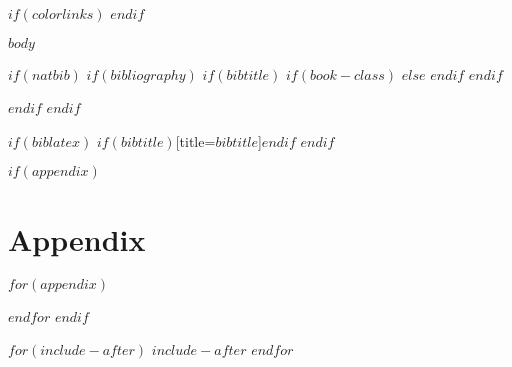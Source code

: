 \documentclass[a4paper, 12pt, twoside]{$thesis_class$}
\theoremstyle{plain}
\theoremstyle{definition}
\theoremstyle{remark}
\begin{document}
$if(colorlinks)$ \hypersetup{linkcolor=$if(linkcolor)$$linkcolor$$else$cyan$endif$} $endif$

$body$


$if(natbib)$
$if(bibliography)$
$if(bibtitle)$
$if(book-class)$
\renewcommand\bibname{$bibtitle$}
$else$
\renewcommand\refname{$bibtitle$}
$endif$
$endif$

$endif$
$endif$

$if(biblatex)$
\printbibliography$if(bibtitle)$[title=$bibtitle$]$endif$
$endif$

$if(appendix)$
\setcounter{secnumdepth}{0}
\chapter*{Appendix}\label{appendix}
$for(appendix)$

\newpage
$endfor$
$endif$

$for(include-after)$
$include-after$
$endfor$
\end{document}
